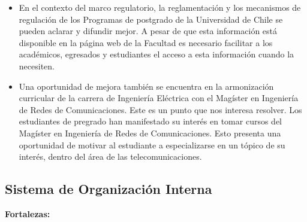 \begin{itemize}
\item En el contexto del marco regulatorio, la reglamentación y los mecanismos de regulación de los Programas de postgrado de la
Universidad de Chile se pueden aclarar y difundir mejor. A pesar de que esta información está disponible en la página web de la
Facultad es necesario facilitar a los académicos, egresados y estudiantes el acceso a esta información cuando la necesiten.
\item Una oportunidad de mejora también se encuentra en la armonización curricular de la carrera de Ingeniería Eléctrica con el Magíster en Ingeniería de Redes de Comunicaciones.
Este es un punto que nos interesa resolver. Los estudiantes de pregrado han manifestado su interés en tomar cursos del Magíster en Ingeniería de Redes de Comunicaciones. Esto 
presenta una oportunidad de motivar al estudiante a especializarse en un tópico de su interés, dentro del área de las telecomunicaciones.
\end{itemize}



\subsection{Sistema de Organización Interna}

\noindent\textbf{Fortalezas:}

